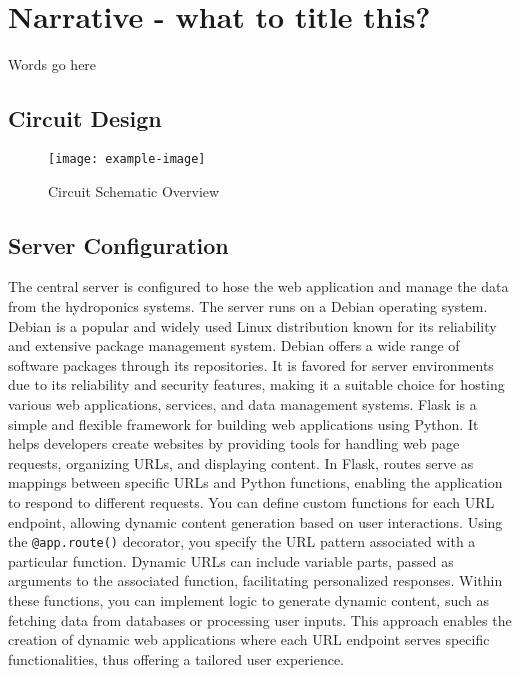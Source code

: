 \documentclass[12pt]{article}
\begin{document}
\section{Narrative - what to title this?}
\noindent  Words go here

\subsection{Circuit Design}
\noindent

\begin{figure}[H]
    \centering
    \texttt{[image: example-image]}
    \caption{Circuit Schematic Overview}
    \label{fig:Schmatic_Full}
\end{figure}

\subsection{Server Configuration}
\noindent The central server is configured to hose the web application and manage the data 
from the hydroponics systems. The server runs on a Debian operating system. Debian is a popular and widely used Linux distribution known for its reliability and extensive package management system. Debian offers a wide range of software packages through its repositories. It is favored for server environments due to its reliability and security features, making it a suitable choice for hosting various web applications, services, and data management systems.
\newline
\newline
\noindent Flask is a simple and flexible framework for building web applications using Python. It helps developers create websites by providing tools for handling web page requests, organizing URLs, and displaying content. In Flask, routes serve as mappings between specific URLs and Python functions, enabling the application to respond to different requests. You can define custom functions for each URL endpoint, allowing dynamic content generation based on user interactions. Using the \verb|@app.route()| decorator, you specify the URL pattern associated with a particular function. Dynamic URLs can include variable parts, passed as arguments to the associated function, facilitating personalized responses. Within these functions, you can implement logic to generate dynamic content, such as fetching data from databases or processing user inputs. This approach enables the creation of dynamic web applications where each URL endpoint serves specific functionalities, thus offering a tailored user experience.
\end{document}

